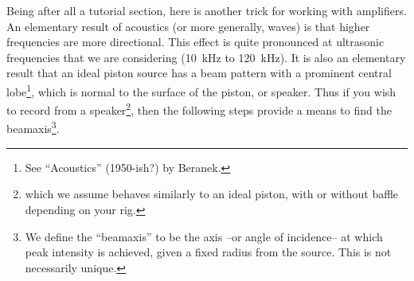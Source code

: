 \documentclass[letterpaper]{article}
\begin{document}
Being after all a tutorial section, here is another trick for working
with amplifiers. An elementary result of acoustics (or more generally,
waves) is that higher frequencies are more directional. This effect is
quite pronounced at ultrasonic frequencies that we are considering
(10~kHz to 120~kHz). It is also an elementary result that an ideal
piston source has a beam pattern with a prominent central
lobe\footnote{See ``Acoustics'' (1950-ish?) by Beranek.}, which is
normal to the surface of the piston, or speaker. Thus if you wish to
record from a speaker\footnote{which we assume behaves similarly to an
  ideal piston, with or without baffle depending on your rig.}, then
the following steps provide a means to find the beamaxis\footnote{We
  define the ``beamaxis'' to be the axis --or angle of incidence-- at
  which peak intensity is achieved, given a fixed radius from the
  source. This is not necessarily unique.}.
\end{document}
